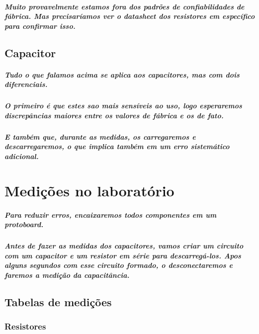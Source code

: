 \documentclass[12pt,twoside, a4paper, twocolumn]{article}
\begin{document}
\subparagraph*{Muito provavelmente estamos fora dos padrões de confiabilidades de fábrica. Mas precisaríamos ver o \emph{datasheet} dos resistores em específico para confirmar isso.}

\subsection{Capacitor}

\subparagraph*{Tudo o que falamos acima se aplica aos capacitores, mas com dois diferenciais.}

\subparagraph*{O primeiro é que estes sao mais sensíveis ao uso, logo esperaremos discrepâncias maiores entre os valores de fábrica e os de fato.}

\subparagraph*{E também que, durante as medidas, os carregaremos e descarregaremos, o que implica também em um erro sistemático adicional.}


\section{Medições no laboratório}

\subparagraph*{Para reduzir erros, encaixaremos todos componentes em um \emph{protoboard}.}

\subparagraph*{Antes de fazer as medidas dos capacitores, vamos criar um circuito com um capacitor e um resistor em série para descarregá-los. Apos alguns segundos com esse circuito formado, o desconectaremos e faremos a medição da capacitância.}

\subsection{Tabelas de medições}

\subsubsection{Resistores}
\end{document}
